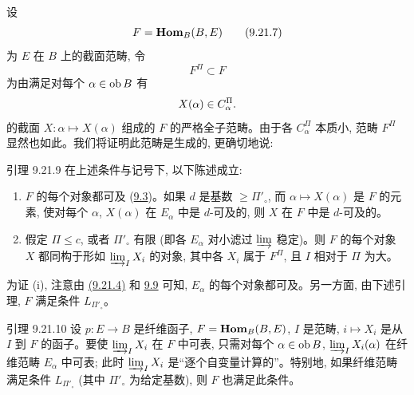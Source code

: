 设
\hypertarget{sga4.exp.I.equation.9.21.7}{}\begin{equation}
F=\operatorname{\mathbf{Hom}}_B(B,E)\tag{9.21.7}
\end{equation}
为 $E$ 在 $B$ 上的截面范畴, 令
\hypertarget{sga4.exp.I.equation.9.21.8}{}\begin{equation}
F^{\Pi}\subset F\tag{9.21.8}
\end{equation}
为由满足对每个 $\alpha\in\operatorname{ob} B$ 有
$$
X(\alpha)\in C^{\Pi}_{\alpha}{}.
$$
的截面 $X:\alpha\mapsto X(\alpha)$ 组成的 $F$ 的严格全子范畴。由于\pageoriginale 各 $C^{\Pi}_{\alpha}$ 本质小, 范畴 $F^{\Pi}$ 显然也如此。我们将证明此范畴是生成的, 更确切地说:


\begin{enonce*}{引理 9.21.9}
在上述条件与记号下, 以下陈述成立:
\begin{enumerate}
\renewcommand{\theenumi}{\roman{enumi}}
\renewcommand{\labelenumi}{(\theenumi)}
\item $F$ 的每个对象都可及 (\hyperref[I.def9.3]{9.3})。如果 $d$ 是基数 $\geq\Pi'_\circ$, 而 $\alpha\mapsto X(\alpha)$ 是 $F$ 的元素, 使对每个 $\alpha$, $X(\alpha)$ 在 $E_\alpha$ 中是 $d$-可及的, 则 $X$ 在 $F$ 中是 $d$-可及的。

\item 假定 $\Pi\leq c$, 或者 $\Pi'_\circ$ 有限 (即各 $E_\alpha$ 对小滤过 $\varinjlim$ 稳定)。则 $F$ 的每个对象 $X$ 都同构于形如 $\varinjlim_I X_i$ 的对象, 其中各 $X_i$ 属于 $F^{\Pi}$, 且 $I$ 相对于 $\Pi$ 为大。
\end{enumerate}
\end{enonce*}

为证 (i), 注意由 \hyperlink{sga4.exp.I.equation.9.21.4}{(9.21.4)} 和 \hyperref[I.cor9.9]{9.9} 可知, $E_\alpha$ 的每个对象都可及。另一方面, 由下述引理, $F$ 满足条件 $L_{\Pi'_\circ}$。

\begin{enonce*}{引理 9.21.10}
设 $p:E\rightarrow B$ 是纤维函子, $F=\operatorname{\mathbf{Hom}}_B(B,E)$, $I$ 是范畴, $i\mapsto X_i$ 是从 $I$ 到 $F$ 的函子。要使 $\varinjlim_I X_i$ 在 $F$ 中可表, 只需对每个 $\alpha\in\operatorname{ob} B$, $\varinjlim_I X_i(\alpha)$ 在纤维范畴 $E_\alpha$ 中可表; 此时 $\varinjlim_I X_i$ 是“逐个自变量计算的”。特别地, 如果纤维范畴满足条件 $L_{\Pi'_\circ}$ (其中 $\Pi'_\circ$ 为给定基数), 则 $F$ 也满足此条件。
\end{enonce*}

